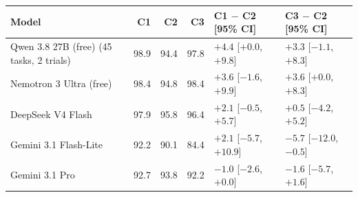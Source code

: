 \begin{tabular}{lrrrll}
\toprule
Model & C1 & C2 & C3 & C1 $-$ C2 [95\% CI] & C3 $-$ C2 [95\% CI] \\
\midrule
Qwen 3.8 27B (free) (45 tasks, 2 trials) & 98.9 & 94.4 & 97.8 & $+4.4$ [$+0.0$, $+9.8$] & $+3.3$ [$-1.1$, $+8.3$] \\
Nemotron 3 Ultra (free) & 98.4 & 94.8 & 98.4 & $+3.6$ [$-1.6$, $+9.9$] & $+3.6$ [$+0.0$, $+8.3$] \\
DeepSeek V4 Flash & 97.9 & 95.8 & 96.4 & $+2.1$ [$-0.5$, $+5.7$] & $+0.5$ [$-4.2$, $+5.2$] \\
Gemini 3.1 Flash-Lite & 92.2 & 90.1 & 84.4 & $+2.1$ [$-5.7$, $+10.9$] & $-5.7$ [$-12.0$, $-0.5$] \\
Gemini 3.1 Pro & 92.7 & 93.8 & 92.2 & $-1.0$ [$-2.6$, $+0.0$] & $-1.6$ [$-5.7$, $+1.6$] \\
\bottomrule
\end{tabular}
